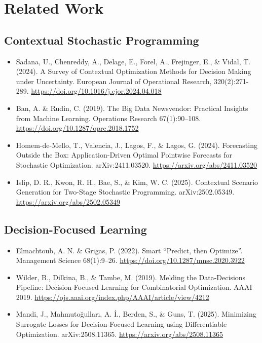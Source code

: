 \documentclass[11pt]{article}
\begin{document}
\section{Related Work}
\subsection*{Contextual Stochastic Programming}
\begin{itemize}
  \item Sadana, U., Chenreddy, A., Delage, E., Forel, A., Frejinger, E., \& Vidal, T. (2024). A Survey of Contextual Optimization Methods for Decision Making under Uncertainty. European Journal of Operational Research, 320(2):271-289. \url{https://doi.org/10.1016/j.ejor.2024.04.018}
  \item Ban, A. \& Rudin, C. (2019). The Big Data Newsvendor: Practical Insights from Machine Learning. Operations Research 67(1):90–108. \url{https://doi.org/10.1287/opre.2018.1752}
  \item Homem-de-Mello, T., Valencia, J., Lagos, F., \& Lagos, G. (2024). Forecasting Outside the Box: Application-Driven Optimal Pointwise Forecasts for Stochastic Optimization. arXiv:2411.03520. \url{https://arxiv.org/abs/2411.03520}
  \item Islip, D. R., Kwon, R. H., Bae, S., \& Kim, W. C. (2025). Contextual Scenario Generation for Two-Stage Stochastic Programming. arXiv:2502.05349. \url{https://arxiv.org/abs/2502.05349}
\end{itemize}

\subsection*{Decision-Focused Learning}
\begin{itemize}
  \item Elmachtoub, A. N. \& Grigas, P. (2022). Smart “Predict, then Optimize”. Management Science 68(1):9–26. \url{https://doi.org/10.1287/mnsc.2020.3922}
  \item Wilder, B., Dilkina, B., \& Tambe, M. (2019). Melding the Data-Decisions Pipeline: Decision-Focused Learning for Combinatorial Optimization. AAAI 2019. \url{https://ojs.aaai.org/index.php/AAAI/article/view/4212}
  \item Mandi, J., Mahmutoğulları, A. İ., Berden, S., \& Guns, T. (2025). Minimizing Surrogate Losses for Decision-Focused Learning using Differentiable Optimization. arXiv:2508.11365. \url{https://arxiv.org/abs/2508.11365}
\end{itemize}
\end{document}

